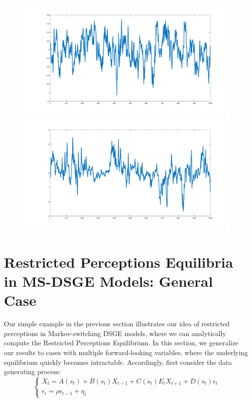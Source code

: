 \documentclass[12pt,reqno]{article}
\numberwithin{equation}{section}
\begin{document}
\begin{figure}[H]
\includegraphics[scale=0.2]{fisher_simulation1_pinf.pdf}
\includegraphics[scale=0.2]{fisher_simulation2_pinf.pdf}  \\
\end{figure}

\section{Restricted Perceptions Equilibria in MS-DSGE Models: General Case}

Our simple example in the previous section illustrates our idea of restricted perceptions in Markov-switching DSGE models, where we can analytically compute the Restricted Perceptions Equilibrium. In this section, we generalize our results to cases with multiple forward-looking variables, where the underlying equilibrium quickly becomes intractable. Accordingly, first consider the data generating process: \\

$$
\begin{cases}
X_t = A(s_t) + B(s_t) X_{t-1} + C(s_t) E_t X_{t+1} + D(s_t) \epsilon_t \\
\epsilon_t = \rho \epsilon_{t-1} + \eta_t 
\end{cases}
$$
\end{document}

